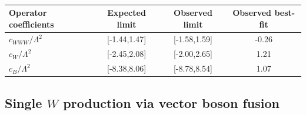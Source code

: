\documentclass[10pt]{article}
\begin{document}
\begin{figure}[htb]
\centering
    \quad\quad
\caption{}
\label{fig:BSMTails}
\end{figure}

\begin{table}[t]
\begin{center}
\caption{}
\label{tab:CMSWVLimits}
\begin{tabular}{l|ccc}  
Operator coefficients & Expected limit & Observed limit & Observed best-fit \\ \hline
$c_{WWW} / \Lambda^2$ & [-1.44,1.47]   & [-1.58,1.59]   & -0.26  \\
$c_{W} / \Lambda^2$   & [-2.45,2.08]   & [-2.00,2.65]   & 1.21   \\
$c_{B} / \Lambda^2$   & [-8.38,8.06]   & [-8.78,8.54]   & 1.07   \\
\end{tabular}
\end{center}
\end{table}

\subsection{Single $W$ production via vector boson fusion}
\end{document}
